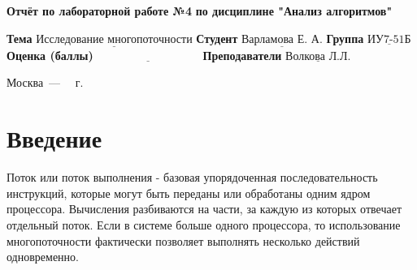 \documentclass[12pt]{report}
\begin{document}
\begin{titlepage}
	
	\begin{center}
		\noindent\begin{minipage}{1.3\textwidth}\centering
			\Large\textbf{  Отчёт по лабораторной работе №4}\newline
			\textbf{по дисциплине "Анализ алгоритмов"}\newline\newline
		\end{minipage}
	\end{center}
	
	\noindent\textbf{Тема} $\underline{\text{Исследование многопоточности}}$\newline\newline
	\noindent\textbf{Студент} $\underline{\text{Варламова Е. А.}}$\newline\newline
	\noindent\textbf{Группа} $\underline{\text{ИУ7-51Б}}$\newline\newline
	\noindent\textbf{Оценка (баллы)} $\underline{\text{~~~~~~~~~~~~~~~~~~~~~~~~~~~}}$\newline\newline
	\noindent\textbf{Преподаватели} $\underline{\text{Волкова Л.Л.}}$\newline\newline\newline
	
	\begin{center}
		\vfill
		Москва~---~\the\year
		~г.
	\end{center}
\end{titlepage}

\setcounter{page}{2}
\tableofcontents

\newpage
\chapter*{Введение}

Поток или поток выполнения - базовая упорядоченная последовательность инструкций, которые могут быть переданы или обработаны одним ядром процессора. Вычисления разбиваются на части, за каждую из которых отвечает отдельный поток. Если в системе больше одного процессора, то использование многопоточности фактически позволяет выполнять несколько действий одновременно.
\end{document}
